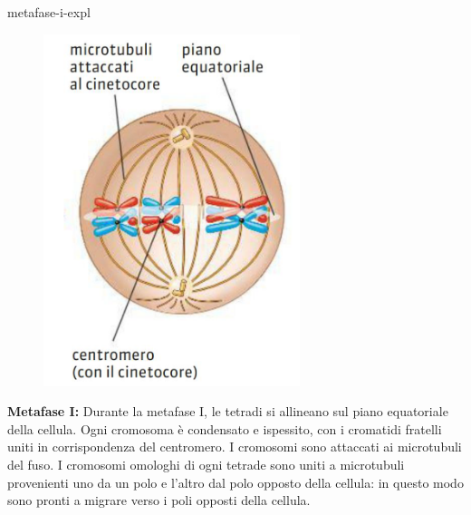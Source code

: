 \documentclass[preview]{standalone}
\begin{document}
\begin{snippet}{metafase-i-expl}
    \setlength{\intextsep}{0pt}%
    \begin{figure}
        \includegraphics[width=7.5cm]{./resources/metafase-i.png}
        \vspace{-1cm}
    \end{figure}

    \textbf{Metafase I:}
    Durante la metafase I, le tetradi si allineano sul piano equatoriale della cellula. Ogni
    cromosoma è condensato e ispessito, con i cromatidi fratelli uniti in corrispondenza del
    centromero. I cromosomi sono attaccati ai microtubuli del fuso. I cromosomi omologhi di
    ogni tetrade sono uniti a microtubuli provenienti uno da un polo e l'altro dal polo opposto
    della cellula: in questo modo sono pronti a migrare verso i poli opposti della cellula.
    \wrapfill
\end{snippet}
\end{document}
